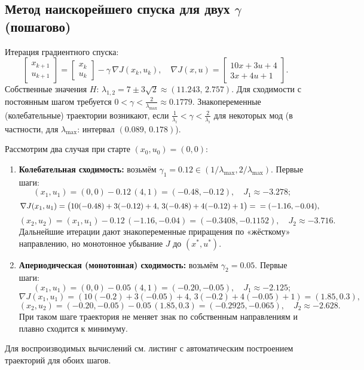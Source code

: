 \subsection{Метод наискорейшего спуска для двух \(\gamma\) (пошагово)}
Итерация градиентного спуска:
\[
\begin{bmatrix}x_{k+1}\\ u_{k+1}\end{bmatrix}=\begin{bmatrix}x_k\\ u_k\end{bmatrix}-\gamma\,\nabla J(x_k,u_k),\quad \nabla J(x,u)=\begin{bmatrix}10x+3u+4\\3x+4u+1\end{bmatrix}.
\]
Собственные значения \(H\): \(\lambda_{1,2}=7\pm3\sqrt{2}\approx(11.243,\,2.757)\). Для сходимости с постоянным шагом требуется \(0<\gamma<\tfrac{2}{\lambda_{\max}}\approx0.1779\). Знакопеременные (колебательные) траектории возникают, если \(\tfrac{1}{\lambda_i}<\gamma<\tfrac{2}{\lambda_i}\) для некоторых мод (в частности, для \(\lambda_{\max}\): интервал \((0.089,\,0.178)\)).

Рассмотрим два случая при старте \((x_0,u_0)=(0,0)\):
\begin{enumerate}
 \item \textbf{Колебательная сходимость:} возьмём \(\gamma_1=0.12\in(1/\lambda_{\max},2/\lambda_{\max})\). Первые шаги:
 \[
 (x_1,u_1)=(0,0)-0.12\,(4,1)=(-0.48,-0.12),\quad J_1\approx-3.278;
 \]
 \[
 \nabla J(x_1,u_1)=\big(10(-0.48)+3(-0.12)+4,\,3(-0.48)+4(-0.12)+1\big)=
 \\ =(-1.16,-0.04),
 \]
 \[
 (x_2,u_2)=(x_1,u_1)-0.12\,(-1.16,-0.04)=(-0.3408,-0.1152),\quad J_2\approx-3.716.
 \]
 Дальнейшие итерации дают знакопеременные приращения по «жёсткому» направлению, но монотонное убывание \(J\) до \((x^{\ast},u^{\ast})\).
 \item \textbf{Апериодическая (монотонная) сходимость:} возьмём \(\gamma_2=0.05\). Первые шаги:
 \[
 (x_1,u_1)=(0,0)-0.05\,(4,1)=(-0.20,-0.05),\quad J_1\approx-2.125;
 \]
 \[
 \nabla J(x_1,u_1)=(10(-0.2)+3(-0.05)+4,\,3(-0.2)+4(-0.05)+1)=(1.85,0.3),
 \]
 \[
 (x_2,u_2)=(-0.20,-0.05)-0.05\,(1.85,0.3)=(-0.2925,-0.065),\quad J_2\approx-2.628.
 \]
 При таком шаге траектория не меняет знак по собственным направлениям и плавно сходится к минимуму.
\end{enumerate}
Для воспроизводимых вычислений см. листинг с автоматическим построением траекторий для обоих шагов.

